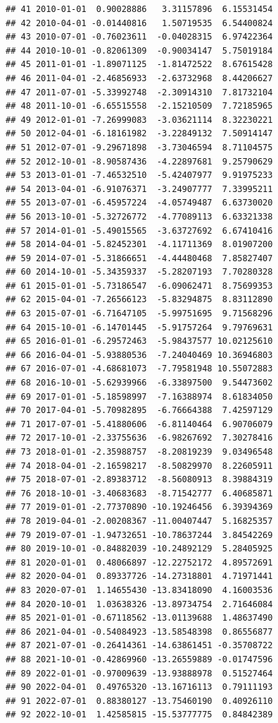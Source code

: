 \documentclass[
]{article}
\begin{document}
\begin{verbatim}
## 41 2010-01-01  0.90028886   3.31157896  6.15531454
## 42 2010-04-01 -0.01440816   1.50719535  6.54400824
## 43 2010-07-01 -0.76023611  -0.04028315  6.97422364
## 44 2010-10-01 -0.82061309  -0.90034147  5.75019184
## 45 2011-01-01 -1.89071125  -1.81472522  8.67615428
## 46 2011-04-01 -2.46856933  -2.63732968  8.44206627
## 47 2011-07-01 -5.33992748  -2.30914310  7.81732104
## 48 2011-10-01 -6.65515558  -2.15210509  7.72185965
## 49 2012-01-01 -7.26999083  -3.03621114  8.32230221
## 50 2012-04-01 -6.18161982  -3.22849132  7.50914147
## 51 2012-07-01 -9.29671898  -3.73046594  8.71104575
## 52 2012-10-01 -8.90587436  -4.22897681  9.25790629
## 53 2013-01-01 -7.46532510  -5.42407977  9.91975233
## 54 2013-04-01 -6.91076371  -3.24907777  7.33995211
## 55 2013-07-01 -6.45957224  -4.05749487  6.63730020
## 56 2013-10-01 -5.32726772  -4.77089113  6.63321338
## 57 2014-01-01 -5.49015565  -3.63727692  6.67410416
## 58 2014-04-01 -5.82452301  -4.11711369  8.01907200
## 59 2014-07-01 -5.31866651  -4.44480468  7.85827407
## 60 2014-10-01 -5.34359337  -5.28207193  7.70280328
## 61 2015-01-01 -5.73186547  -6.09062471  8.75699353
## 62 2015-04-01 -7.26566123  -5.83294875  8.83112890
## 63 2015-07-01 -6.71647105  -5.99751695  9.71568296
## 64 2015-10-01 -6.14701445  -5.91757264  9.79769631
## 65 2016-01-01 -6.29572463  -5.98437577 10.02125610
## 66 2016-04-01 -5.93880536  -7.24040469 10.36946803
## 67 2016-07-01 -4.68681073  -7.79581948 10.55072883
## 68 2016-10-01 -5.62939966  -6.33897500  9.54473602
## 69 2017-01-01 -5.18598997  -7.16388974  8.61834050
## 70 2017-04-01 -5.70982895  -6.76664388  7.42597129
## 71 2017-07-01 -5.41880606  -6.81140464  6.90706079
## 72 2017-10-01 -2.33755636  -6.98267692  7.30278416
## 73 2018-01-01 -2.35988757  -8.20819239  9.03496548
## 74 2018-04-01 -2.16598217  -8.50829970  8.22605911
## 75 2018-07-01 -2.89383712  -8.56080913  8.39884319
## 76 2018-10-01 -3.40683683  -8.71542777  6.40685871
## 77 2019-01-01 -2.77370890 -10.19246456  6.39394369
## 78 2019-04-01 -2.00208367 -11.00407447  5.16825357
## 79 2019-07-01 -1.94732651 -10.78637244  3.84542269
## 80 2019-10-01 -0.84882039 -10.24892129  5.28405925
## 81 2020-01-01  0.48066897 -12.22752172  4.89572691
## 82 2020-04-01  0.89337726 -14.27318801  4.71971441
## 83 2020-07-01  1.14655430 -13.83418090  4.16003536
## 84 2020-10-01  1.03638326 -13.89734754  2.71646084
## 85 2021-01-01 -0.67118562 -13.01139688  1.48637490
## 86 2021-04-01 -0.54084923 -13.58548398  0.86556877
## 87 2021-07-01 -0.26414361 -14.63861451 -0.35708722
## 88 2021-10-01 -0.42869960 -13.26559889 -0.01747596
## 89 2022-01-01 -0.97009639 -13.93888978  0.51527464
## 90 2022-04-01  0.49765320 -13.16716113  0.79111193
## 91 2022-07-01  0.88380127 -13.75460190  0.40926110
## 92 2022-10-01  1.42585815 -15.53777775  0.84842389
\end{verbatim}
\end{document}
